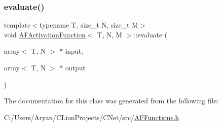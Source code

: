 \mbox{\label{class_a_f_activation_function_adeaf0636a7bb08eb73d58f8cd663d9d8}} 
\subsubsection{\texorpdfstring{evaluate()}{evaluate()}}
{\footnotesize\ttfamily template$<$typename T, size\+\_\+t N, size\+\_\+t M$>$ \\
void \hyperlink{class_a_f_activation_function}{A\+F\+Activation\+Function}$<$ T, N, M $>$\+::evaluate (\begin{DoxyParamCaption}\item[{array$<$ T, N $>$ $\ast$}]{input,  }\item[{array$<$ T, N $>$ $\ast$}]{output }\end{DoxyParamCaption})\hspace{0.3cm}{\ttfamily [inline]}}



The documentation for this class was generated from the following file\+:\begin{DoxyCompactItemize}
\item 
C\+:/\+Users/\+Aryan/\+C\+Lion\+Projects/\+C\+Net/src/\hyperlink{_a_f_functions_8h}{A\+F\+Functions.\+h}\end{DoxyCompactItemize}
